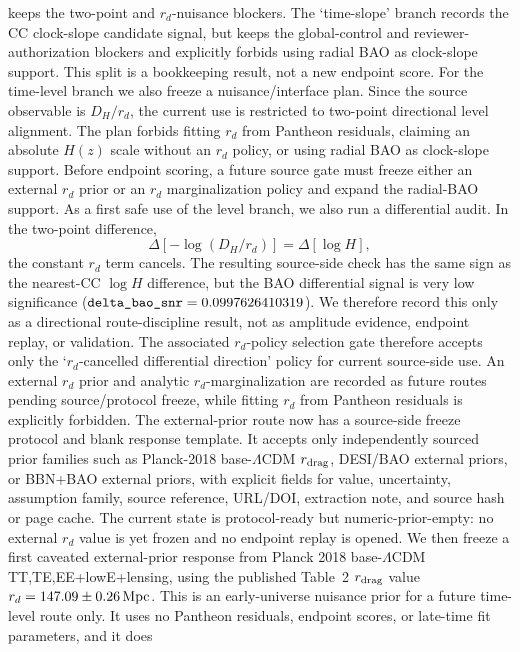 \documentclass[11pt]{article}
\begin{document}
keeps the two-point and \(r_d\)-nuisance blockers.  The `time-slope' branch
records the CC clock-slope candidate signal, but keeps the global-control and
reviewer-authorization blockers and explicitly forbids using radial BAO as
clock-slope support.  This split is a bookkeeping result, not a new endpoint
score.
For the time-level branch we also freeze a nuisance/interface plan.  Since the
source observable is \(D_H/r_d\), the current use is restricted to two-point
directional level alignment.  The plan forbids fitting \(r_d\) from Pantheon
residuals, claiming an absolute \(H(z)\) scale without an \(r_d\) policy, or
using radial BAO as clock-slope support.  Before endpoint scoring, a future
source gate must freeze either an external \(r_d\) prior or an \(r_d\)
marginalization policy and expand the radial-BAO support.
As a first safe use of the level branch, we also run a differential audit.  In
the two-point difference,
\[
  \Delta[-\log(D_H/r_d)] = \Delta[\log H],
\]
the constant \(r_d\) term cancels.  The resulting source-side check has the
same sign as the nearest-CC \(\log H\) difference, but the BAO differential
signal is very low significance
(\(\texttt{delta\_\allowbreak{}bao\_\allowbreak{}snr}=0.0997626410319\)).  We therefore record this only
as a directional route-discipline result, not as amplitude evidence, endpoint
replay, or validation.
The associated \(r_d\)-policy selection gate therefore accepts only the
`\(r_d\)-cancelled differential direction' policy for current source-side use.
An external \(r_d\) prior and analytic \(r_d\)-marginalization are recorded as
future routes pending source/protocol freeze, while fitting \(r_d\) from
Pantheon residuals is explicitly forbidden.
The external-prior route now has a source-side freeze protocol and blank
response template.  It accepts only independently sourced prior families such as
Planck-2018 base-\(\Lambda\)CDM \(r_{\rm drag}\), DESI/BAO external priors, or
BBN+BAO external priors, with explicit fields for value, uncertainty,
assumption family, source reference, URL/DOI, extraction note, and source hash
or page cache.  The current state is protocol-ready but numeric-prior-empty:
no external \(r_d\) value is yet frozen and no endpoint replay is opened.
We then freeze a first caveated external-prior response from Planck 2018
base-\(\Lambda\)CDM TT,TE,EE+lowE+lensing, using the published Table~2
\(r_{\rm drag}\) value \(r_d=147.09\pm0.26\,{\rm Mpc}\).  This is an
early-universe nuisance prior for a future time-level route only.  It uses no
Pantheon residuals, endpoint scores, or late-time fit parameters, and it does
\end{document}
